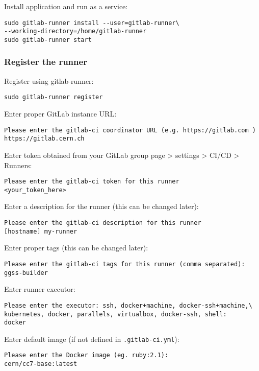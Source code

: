 \noindent
Install application and run as a service:
\begin{lstlisting}
sudo gitlab-runner install --user=gitlab-runner\
--working-directory=/home/gitlab-runner
sudo gitlab-runner start
\end{lstlisting}

\subsubsection*{Register the runner}

\noindent
Register using gitlab-runner:
\begin{lstlisting}
sudo gitlab-runner register
\end{lstlisting}

\noindent
Enter proper GitLab instance URL:
\begin{lstlisting}
Please enter the gitlab-ci coordinator URL (e.g. https://gitlab.com )
https://gitlab.cern.ch
\end{lstlisting}

\noindent
Enter token obtained from your GitLab group page > settings > CI/CD > Runners:
\begin{lstlisting}
Please enter the gitlab-ci token for this runner
<your_token_here>
\end{lstlisting}

\noindent
Enter a description for the runner (this can be changed later):
\begin{lstlisting}
Please enter the gitlab-ci description for this runner
[hostname] my-runner
\end{lstlisting}

\noindent
Enter proper tags (this can be changed later):
\begin{lstlisting}
Please enter the gitlab-ci tags for this runner (comma separated):
ggss-builder
\end{lstlisting}

\noindent
Enter runner executor:
\begin{lstlisting}
Please enter the executor: ssh, docker+machine, docker-ssh+machine,\
kubernetes, docker, parallels, virtualbox, docker-ssh, shell:
docker
\end{lstlisting}

\noindent
Enter default image (if not defined in \lstinline{.gitlab-ci.yml}):
\begin{lstlisting}
Please enter the Docker image (eg. ruby:2.1):
cern/cc7-base:latest
\end{lstlisting}


